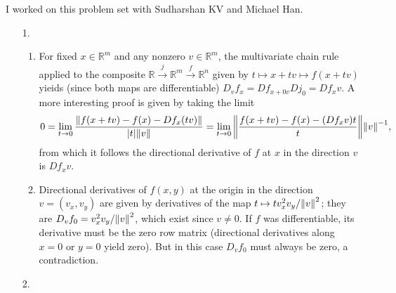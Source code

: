 \documentclass[11pt,leqno]{article}
\theoremstyle{plain}
\theoremstyle{definition}
\numberwithin{equation}{section}
\numberwithin{lem}{section}
\DeclareMathOperator{\im}{im}
\begin{document}
I worked on this problem set with Sudharshan KV and Michael Han.
\begin{enumerate}
    \item[1.] \begin{enumerate}
      \item For fixed $x\in \mathbb R^m$ and any nonzero $v\in\mathbb R^m$, the multivariate chain rule applied to the composite $\mathbb R\xrightarrow{j} \mathbb R^m\xrightarrow{f} \mathbb R^n$ given by $t\mapsto x+tv\mapsto f(x+tv)$ yieids (since both maps are differentiable) $D_vf_x = Df_{x+0v}Dj_0 = Df_xv$. A more interesting proof is given by taking the limit 
      \[0=\lim_{t\to 0}\frac{\norm{f(x+tv)-f(x) - Df_x(tv)}}{\abs{t}\norm{v}} = \lim_{t\to 0}{\norm{\frac{f(x+tv)-f(x)-(Df_xv)t}{t}}}\norm{v}^{-1},\] from which it follows the directional derivative of $f$ at $x$ in the direction $v$ is $Df_xv$.
      \item Directional derivatives of $f(x,y)$ at the origin in the direction $v=(v_x,v_y)$ are given by derivatives of the map $t\mapsto tv_x^2v_y/\norm{v}^2$; they are $D_vf_0 = v_x^2v_y/\norm{v}^2$, which exist since $v\neq 0$. If $f$ was differentiable, its derivative must be the zero row matrix (directional derivatives along $x = 0$ or $y = 0$ yield zero). But in this case $D_vf_0$ must always be zero, a contradiction.
    \end{enumerate}
    \item[2.] 
\end{enumerate}
\end{document}

